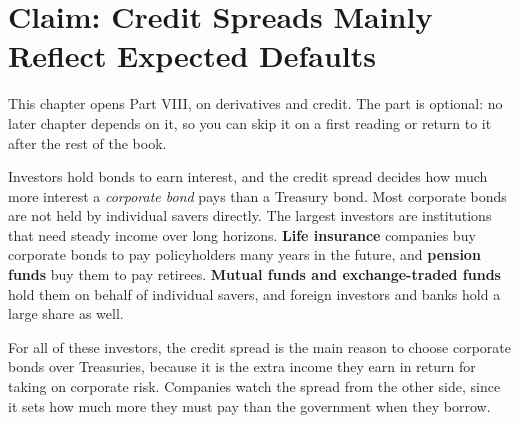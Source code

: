 \makeatletter
{}
\makeatother

\makeatletter
\makeatother

\chapter{Claim: Credit Spreads Mainly Reflect Expected Defaults}
\label{ch:16}
\providecommand{\term}[1]{\emph{#1}}

This chapter opens Part VIII, on derivatives and credit. The part is optional: no later chapter depends on it, so you can skip it on a first reading or return to it after the rest of the book.

Investors hold bonds to earn interest, and the credit spread decides how much more interest a \term{corporate bond} pays than a Treasury bond. Most corporate bonds are not held by individual savers directly. The largest investors are institutions that need steady income over long horizons. \textbf{Life insurance} companies buy corporate bonds to pay policyholders many years in the future, and \textbf{pension funds} buy them to pay retirees. \textbf{Mutual funds and exchange-traded funds} hold them on behalf of individual savers, and foreign investors and banks hold a large share as well.

For all of these investors, the credit spread is the main reason to choose corporate bonds over Treasuries, because it is the extra income they earn in return for taking on corporate risk. Companies watch the spread from the other side, since it sets how much more they must pay than the government when they borrow.


